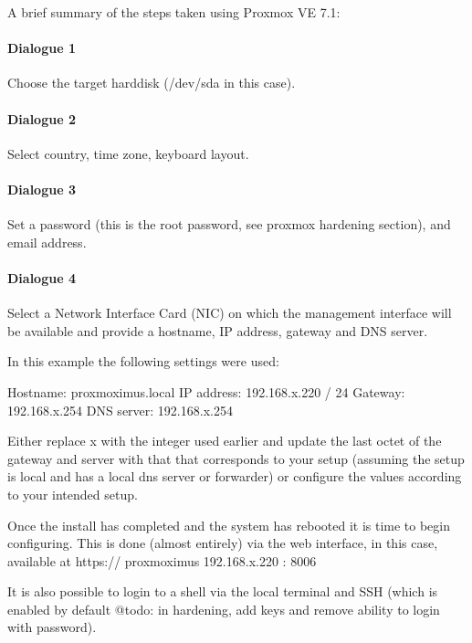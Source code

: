 A brief summary of the steps taken using Proxmox VE 7.1:

\hypertarget{dialogue-1}{%
\paragraph{Dialogue 1}\label{dialogue-1}}

Choose the target harddisk (/dev/sda in this case).

\hypertarget{dialogue-2}{%
\paragraph{Dialogue 2}\label{dialogue-2}}

Select country, time zone, keyboard layout.

\hypertarget{dialogue-3}{%
\paragraph{Dialogue 3}\label{dialogue-3}}

Set a password (this is the root password, see proxmox hardening
section), and email address.

\hypertarget{dialogue-4}{%
\paragraph{Dialogue 4}\label{dialogue-4}}

Select a Network Interface Card (NIC) on which the management interface
will be available and provide a hostname, IP address, gateway and DNS
server.

In this example the following settings were used:

Hostname: proxmoximus.local IP address: 192.168.x.220 / 24 Gateway:
192.168.x.254 DNS server: 192.168.x.254

Either replace x with the integer used earlier and update the last octet
of the gateway and server with that that corresponds to your setup
(assuming the setup is local and has a local dns server or forwarder) or
configure the values according to your intended setup.

Once the install has completed and the system has rebooted it is time to
begin configuring. This is done (almost entirely) via the web interface,
in this case, available at https:// proxmoximus \textbar{} 192.168.x.220
: 8006

It is also possible to login to a shell via the local terminal and SSH
(which is enabled by default @todo: in hardening, add keys and remove
ability to login with password).

